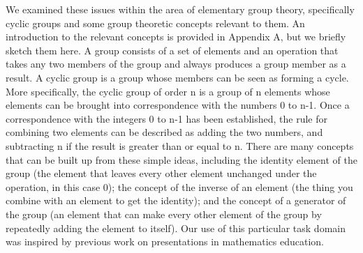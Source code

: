 \documentclass[man,mask,10pt]{apa6}
\begin{document}
We examined these issues within the area of elementary group theory, specifically cyclic groups and some group theoretic concepts relevant to them. An introduction to the relevant concepts is provided in Appendix A, but we briefly sketch them here. A group consists of a set of elements and an operation that takes any two members of the group and always produces a group member as a result. A cyclic group is a group whose members can be seen as forming a cycle. More specifically, the cyclic group of order n is a group of n elements whose elements can be brought into correspondence with the numbers 0 to n-1. Once a correspondence with the integers 0 to n-1 has been established, the rule for combining two elements can be described as adding the two numbers, and subtracting n if the result is greater than or equal to n. There are many concepts that can be built up from these simple ideas, including the identity element of the group (the element that leaves every other element unchanged under the operation, in this case 0); the concept of the inverse of an element (the thing you combine with an element to get the identity); and the concept of a generator of the group (an element that can make every other element of the group by repeatedly adding the element to itself). Our use of this particular task domain was inspired by previous work on presentations in mathematics education. 
\end{document}
